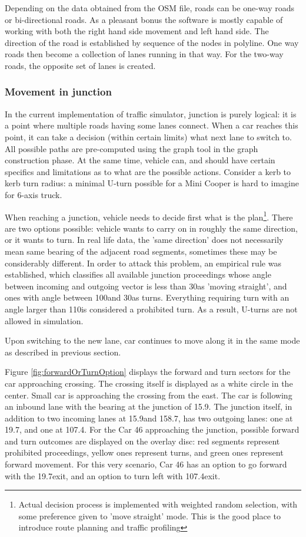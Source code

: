 Depending on the data obtained from the OSM file, roads can be one-way roads or bi-directional roads. As a pleasant bonus the software is mostly capable of working with both the right hand side movement and left hand side. The direction of the road is established by sequence of the nodes in polyline. One way roads then become a collection of lanes running in that way. For the two-way roads, the opposite set of lanes is created.

\subsubsection{Movement in junction}
In the current implementation of traffic simulator, junction is purely logical: it is a point where multiple roads having some lanes connect. When a car reaches this point, it can take a decision (within certain limits) what next lane to switch to. All possible paths are pre-computed using the graph tool in the graph construction phase. At the same time, vehicle can, and should have certain specifics and limitations as to what are the possible actions. Consider a kerb to kerb turn radius: a minimal U-turn possible for a Mini Cooper is hard to imagine for 6-axis truck.

When reaching a junction, vehicle needs to decide first what is the plan\footnote{Actual decision process is implemented with weighted random selection, with some preference given to 'move straight' mode. This is the good place to introduce route planning and traffic profiling}. There are two options possible: vehicle wants to carry on in roughly the same direction, or it wants to turn. In real life data, the 'same direction' does not necessarily mean same bearing of the adjacent road segments, sometimes these may be considerably different. In order to attack this problem, an empirical rule was established, which classifies all available junction proceedings whose angle between incoming and outgoing vector is less than 30\degspc  as 'moving straight', and ones with angle between 100\degspc  and 30\degspc as turns. Everything requiring turn with an angle larger than 110\degspc is considered a prohibited turn. As a result, U-turns are not allowed in simulation.

Upon switching to the new lane, car continues to move along it in the same mode as described in previous section.

Figure \ref{fig:forwardOrTurnOption} displays the forward and turn sectors for the car approaching crossing. The crossing itself is displayed as a white circle in the center. Small car is approaching the crossing from the east. The car is following an inbound lane with the bearing at the junction of 15.9\degspc. The junction itself, in addition to two incoming lanes at 15.9\degspc and 158.7\degspc, has two outgoing lanes: one at 19.7\degspc, and one at 107.4\degspc. For the Car 46 approaching the junction, possible forward and turn outcomes are displayed on the overlay disc: red segments represent prohibited proceedings, yellow ones represent turns, and green ones represent forward movement. For this very scenario, Car 46 has an option to go forward with the 19.7\degspc exit, and an option to turn left with 107.4\degspc exit.

